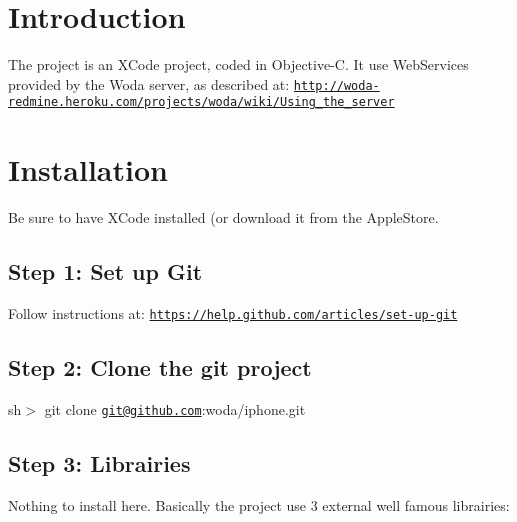 \hypertarget{index_intro_sec}{}\section{Introduction}\label{index_intro_sec}
The project is an X\-Code project, coded in Objective-\/\-C. It use Web\-Services provided by the Woda server, as described at\-: \href{http://woda-redmine.heroku.com/projects/woda/wiki/Using_the_server}{\tt http\-://woda-\/redmine.\-heroku.\-com/projects/woda/wiki/\-Using\-\_\-the\-\_\-server}\hypertarget{index_install_sec}{}\section{Installation}\label{index_install_sec}
Be sure to have X\-Code installed (or download it from the Apple\-Store.\hypertarget{index_step1}{}\subsection{Step 1\-: Set up Git}\label{index_step1}
Follow instructions at\-: \href{https://help.github.com/articles/set-up-git}{\tt https\-://help.\-github.\-com/articles/set-\/up-\/git}\hypertarget{index_step2}{}\subsection{Step 2\-: Clone the git project}\label{index_step2}
sh$>$ git clone \href{mailto:git@github.com}{\tt git@github.\-com}\-:woda/iphone.\-git\hypertarget{index_step3}{}\subsection{Step 3\-: Librairies}\label{index_step3}
Nothing to install here. Basically the project use 3 external well famous librairies\-:
